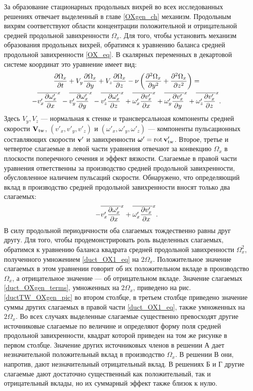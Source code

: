 За образование стационарных продольных вихрей во всех исследованных решениях отвечает выделенный в главе \ref{OXgen_ch} механизм. Продольным вихрям соответствуют области концентрации положительной и отрицательной средней продольной завихренности $\Omega_x$. Для того, чтобы установить механизм образования продольных вихрей, обратимся к уравнению баланса средней продольной завихренности \eqref{OX_eq}. В скалярных переменных в декартовой системе координат это уравнение имеет вид:
\begin{multline}\label{duct_OX1_eq}
\frac{\partial \Omega_x}{\partial t} + V_y \frac{\partial \Omega_x}{\partial y} + V_z \frac{\partial \Omega_x}{\partial z} - \nu\left(\frac{\partial ^2\Omega_x}{\partial y^2} + \frac{\partial ^2\Omega_x}{\partial z^2}\right)= \\
 - \overline{v'_x \frac{\partial \omega'_x}{\partial x}}^x - \overline{v'_y \frac{\partial \omega'_x}{\partial y}}^x - \overline{v'_z \frac{\partial \omega'_x}{\partial z}}^x
 + \overline{\omega'_x \frac{\partial v'_x}{\partial x}}^x + \overline{\omega'_y \frac{\partial v'_x}{\partial y}}^x + \overline{\omega'_z \frac{\partial v'_x}{\partial z}}^x.
\end{multline}
Здесь $V_y, V_z$ --- нормальная к стенке и трансверсальноая компоненты средней скорости $\mathbf{V}_\mathrm{tw}$, $(v'_x, v'_y, v'_z)$ и $(\omega'_x, \omega'_y, \omega'_z)$ --- компоненты пульсационных составляющих скорости $\mathbf{v}'$ и завихренности $\mbox{\boldmath$\omega$}' = \mathop{}\!\operatorname{rot} \mathbf{v}'_\mathrm{tw}$. Второе, третье и четвертое слагаемые в левой части уравнения отвечают за конвекцию $\Omega_x$ в плоскости поперечного сечения и эффект вязкости. Слагаемые в правой части уравнения ответственны за производство средней продольной завихренности, обусловленное наличием пульсаций скорости. Обнаружено, что определяющий вклад в производство средней продольной завихренности вносят только два слагаемых:
\begin{equation}\label{duct_OXgen_terms}
- \overline{v'_x \frac{\partial \omega'_x}{\partial x}}^x + \overline{ \omega'_x \frac{\partial v'_x}{\partial x} }^x.
\end{equation}
В силу продольной периодичности оба слагаемых тождественно равны друг другу. Для того, чтобы продемонстрировать роль выделенных слагаемых, обратимся к уравнению баланса квадрата средней продольной завихренности $\Omega_x^2$, полученного умножением \eqref{duct_OX1_eq} на $2\Omega_x$. Положительное значение слагаемых в этом уравнении говорит об их положительном вкладе в производство $\Omega_x$, а отрицательное значение --- об отрицательном вкладе. Значение слагаемых \eqref{duct_OXgen_terms}, умноженных на $2\Omega_x$, приведено на рис. \ref{ductTW_OXgen_pic} во втором столбце, в третьем столбце приведено значение суммы других слагаемых в правой части \eqref{duct_OX1_eq}, также умноженных на $2\Omega_x$. Во всех случаях выделенные слагаемые существенно превосходят другие источниковые слагаемые по величине и определяют форму поля средней продольной завихренности, квадрат которой приведен на том же рисунке в первом столбце. Значение других источниковых членов в решении А дает незначительной положительный вклад в производство $\Omega_x$. В решении В они, напротив, дают незначительный отрицательный вклад. В решениях Б и Г другие слагаемые дают достаточно существенный как положительный, так и отрицательный вклады, но их суммарный эффект также близок к нулю. 

